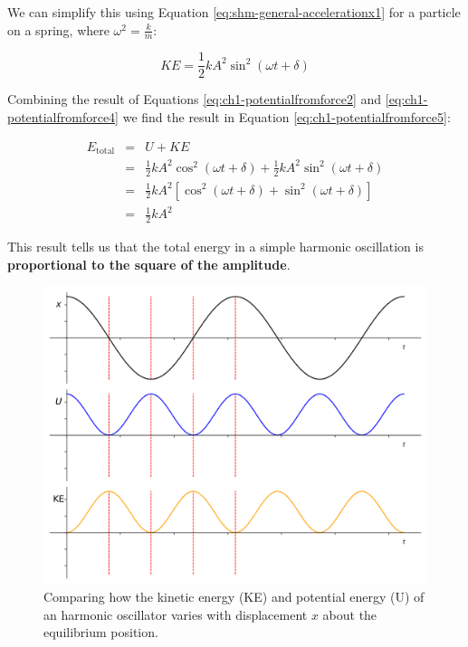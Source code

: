 \documentclass[
]{book}
\begin{document}
We can simplify this using Equation \eqref{eq:shm-general-accelerationx1} for a particle on a spring, where \(\omega^2 = \frac{k}{m}\):

\begin{equation}
KE = \frac{1}{2}kA^2 \sin^2 (\omega t + \delta)
\label{eq:ch1-potentialfromforce4}
\end{equation}

Combining the result of Equations \eqref{eq:ch1-potentialfromforce2} and \eqref{eq:ch1-potentialfromforce4} we find the result in Equation \eqref{eq:ch1-potentialfromforce5}:

\begin{equation}
\begin{array}{rcl}
E_\textrm{total} &=& U + KE \\
& =& \frac{1}{2}kA^2 \cos^2 (\omega t + \delta) + \frac{1}{2}kA^2 \sin^2 (\omega t + \delta)\\
& =& \frac{1}{2}kA^2 \left[ \cos^2 (\omega t + \delta) + \sin^2 (\omega t + \delta)\right]\\
&=& \frac{1}{2}kA^2
\end{array}
\label{eq:ch1-potentialfromforce5}
\end{equation}

This result tells us that the total energy in a simple harmonic oscillation is \textbf{proportional to the square of the amplitude}.

\begin{figure}

{\centering \includegraphics[width=0.7\linewidth]{visualisations/ch1-shmenergy} 

}

\caption{Comparing how the kinetic energy (KE) and potential energy (U) of an harmonic oscillator varies with displacement $x$ about the equilibrium position. }\label{fig:ch1-energyinshm}
\end{figure}
\end{document}
